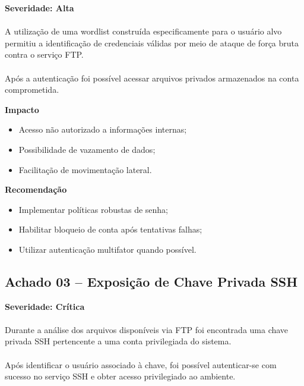 \textbf{Severidade: Alta}

\paragraph{}
A utilização de uma wordlist construída especificamente para o usuário alvo
permitiu a identificação de credenciais válidas por meio de ataque de força
bruta contra o serviço FTP.

\paragraph{}
Após a autenticação foi possível acessar arquivos privados armazenados na conta
comprometida.

\textbf{Impacto}

\begin{itemize}
  \item Acesso não autorizado a informações internas;
  \item Possibilidade de vazamento de dados;
  \item Facilitação de movimentação lateral.
\end{itemize}

\textbf{Recomendação}

\begin{itemize}
  \item Implementar políticas robustas de senha;
  \item Habilitar bloqueio de conta após tentativas falhas;
  \item Utilizar autenticação multifator quando possível.
\end{itemize}

\subsection{Achado 03 -- Exposição de Chave Privada SSH}

\textbf{Severidade: Crítica}

\paragraph{}
Durante a análise dos arquivos disponíveis via FTP foi encontrada uma chave
privada SSH pertencente a uma conta privilegiada do sistema.

\paragraph{}
Após identificar o usuário associado à chave, foi possível autenticar-se com
sucesso no serviço SSH e obter acesso privilegiado ao ambiente.

